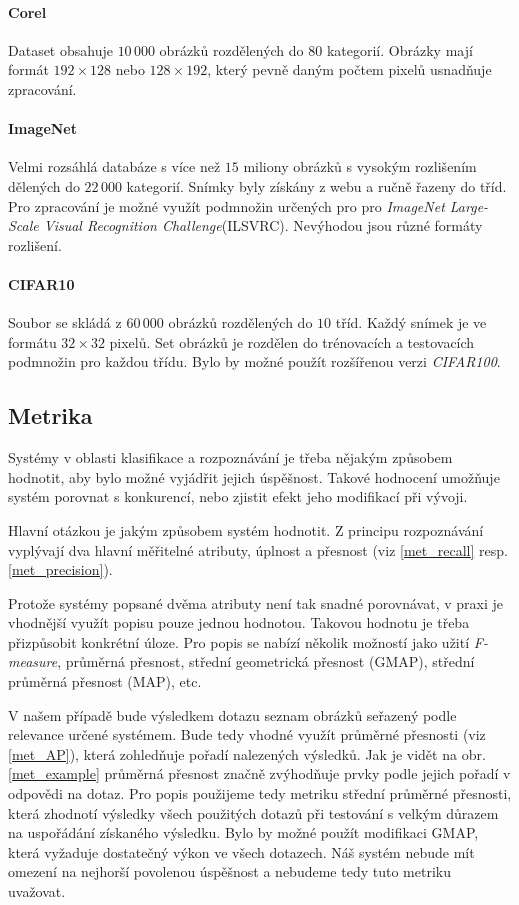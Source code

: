 \documentclass[12pt]{article}
\begin{document}
\paragraph{Corel\cite{corel}}
Dataset obsahuje $10\,000$ obrázků rozdělených do $80$ kategorií. Obrázky mají formát $192\times 128$ nebo $128\times 192$, který pevně daným počtem pixelů usnadňuje zpracování.

\paragraph{ImageNet}
Velmi rozsáhlá databáze s více než $15$ miliony obrázků s vysokým rozlišením dělených do $22\,000$ kategorií. Snímky byly získány z webu a ručně řazeny do tříd. Pro zpracování je možné využít podmnožin určených pro pro \textit{ImageNet Large-Scale Visual Recognition Challenge}(ILSVRC)\cite{ILSVRC15}. Nevýhodou jsou různé formáty rozlišení.

\paragraph{CIFAR10}
Soubor se skládá z $60\,000$ obrázků rozdělených do $10$ tříd. Každý snímek je ve formátu $32\times 32$ pixelů. Set obrázků je rozdělen do trénovacích a testovacích podmnožin pro každou třídu. Bylo by možné použít rozšířenou verzi \textit{CIFAR100}.

\subsection{Metrika}
Systémy v oblasti klasifikace a rozpoznávání je třeba nějakým způsobem hodnotit, aby bylo možné vyjádřit jejich úspěšnost. Takové hodnocení umožňuje systém porovnat s konkurencí, nebo zjistit efekt jeho modifikací při vývoji. 

Hlavní otázkou je jakým způsobem systém hodnotit. Z principu rozpoznávání vyplývají dva hlavní měřitelné atributy, úplnost a přesnost (viz \ref{met_recall} resp. \ref{met_precision}).

Protože systémy popsané dvěma atributy není tak snadné porovnávat, v praxi je vhodnější využít popisu pouze jednou hodnotou. Takovou hodnotu je třeba přizpůsobit konkrétní úloze. Pro popis se nabízí několik možností jako užití \textit{F-measure}, průměrná přesnost, střední geometrická přesnost (GMAP), střední průměrná přesnost (MAP), etc.

V našem případě bude výsledkem dotazu seznam obrázků seřazený podle relevance určené systémem. Bude tedy vhodné využít průměrné přesnosti (viz \ref{met_AP}), která zohledňuje pořadí nalezených výsledků. Jak je vidět na obr.\ref{met_example} průměrná přesnost značně zvýhodňuje prvky podle jejich pořadí v odpovědi na dotaz. Pro popis použijeme tedy metriku střední průměrné přesnosti, která zhodnotí výsledky všech použitých dotazů při testování s velkým důrazem na uspořádání získaného výsledku. Bylo by možné použít modifikaci GMAP, která vyžaduje dostatečný výkon ve všech dotazech. Náš systém nebude mít omezení na nejhorší povolenou úspěšnost a nebudeme tedy tuto metriku uvažovat.
\end{document}
